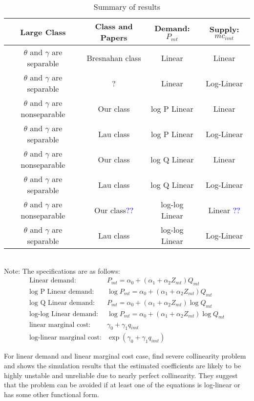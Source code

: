 \documentclass[11pt]{article}
\begin{document}
\begin{table}[!ht]
\caption{Summary of results}
\centering
\scriptsize
\begin{tabular}{c|c|c|c} 
 \hline
 Large Class & Class and Papers & Demand: $P_{mt}$ &  Supply: $mc_{imt}$ \\ 
 \hline
 $\theta$ and $\gamma$ are separable &Bresnahan class \citep{merel2009measuring}& Linear  &  Linear \\ 
 $\theta$ and $\gamma$ are separable&? \citep{perloff2012collinearity} & Linear  &  Log-Linear \\  
 $\theta$ and $\gamma$ are nonseparable&Our class & log P Linear  &  Linear \\ 
 $\theta$ and $\gamma$ are separable &Lau class & log P Linear  &  Log-Linear \\ 
 $\theta$ and $\gamma$ are nonseparable&Our class & log Q Linear  &  Linear \\ 
 $\theta$ and $\gamma$ are separable&Lau class \citep{coccorese2013multimarket}& log Q Linear  &  Log-Linear\\ 
 $\theta$ and $\gamma$ are nonseparable&Our class\citep{okazaki2022excess,merel2009measuring}\textcolor{blue}{??}& log-log Linear  &  Linear  \textcolor{blue}{??} \\ 
  $\theta$ and $\gamma$ are separable&Lau class \citep{hyde1995can}& log-log Linear  &  Log-Linear\\ 
 \hline
\end{tabular}
\label{tb:summary_of_results}
\\
\footnotesize Note: The specifications are as follows:
\begin{align*}
    \text{Linear demand:}& P_{mt}=\alpha_0+(\alpha_1+\alpha_2 Z_{mt}) Q_{mt}\\
    \text{log P Linear demand:}&
    \log P_{mt}=\alpha_0+(\alpha_1+\alpha_2 Z_{mt}) Q_{mt}\\
    \text{log Q Linear demand:}&    P_{mt}=\alpha_0+(\alpha_1+\alpha_2 Z_{mt}) \log Q_{mt}\\
    \text{log-log Linear demand:}&
    \log P_{mt}=\alpha_0+(\alpha_1+\alpha_2 Z_{mt})\log Q_{mt}\\
    \text{linear marginal cost}:&
    \gamma_0+\gamma_1 q_{imt}\\
    \text{log-linear marginal cost}:&
    \exp(\gamma_0+\gamma_1 q_{imt})
\end{align*}
\end{table}

For linear demand and linear marginal cost case, \cite{perloff2012collinearity} find severe collinearity problem and shows the simulation results that the estimated coefficients are likely to be highly unstable and unreliable due to nearly perfect collinearity. They suggest that the problem can be avoided if at least one of the equations is log-linear or has some other functional form.
\end{document}
